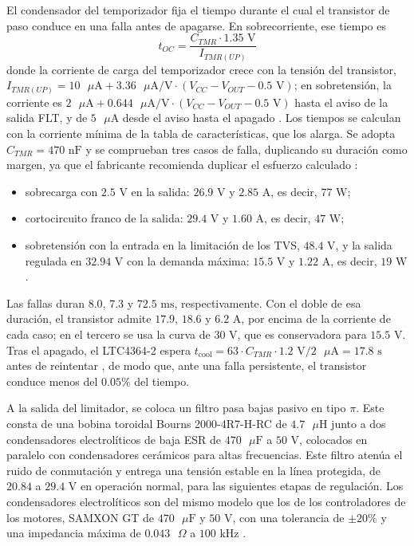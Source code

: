 \documentclass[../../General.tex]{subfiles}
\begin{document}
El condensador del temporizador fija el tiempo durante el cual el transistor de paso conduce en una falla antes de apagarse. En sobrecorriente, ese tiempo es \citep{adi_ltc4364}
\begin{equation}
t_{OC} = \frac{C_{TMR} \cdot 1.35\text{ V}}{I_{TMR(UP)}}
\end{equation}
donde la corriente de carga del temporizador crece con la tensión del transistor, $I_{TMR(UP)} = 10\text{ }\mu\text{A} + 3.36\text{ }\mu\text{A/V} \cdot (V_{CC} - V_{OUT} - 0.5\text{ V})$; en sobretensión, la corriente es $2\text{ }\mu\text{A} + 0.644\text{ }\mu\text{A/V} \cdot (V_{CC} - V_{OUT} - 0.5\text{ V})$ hasta el aviso de la salida FLT, y de $5\text{ }\mu\text{A}$ desde el aviso hasta el apagado \citep{adi_ltc4364}. Los tiempos se calculan con la corriente mínima de la tabla de características, que los alarga. Se adopta $C_{TMR} = 470\text{ nF}$ y se comprueban tres casos de falla, duplicando su duración como margen, ya que el fabricante recomienda duplicar el esfuerzo calculado \citep{adi_ltc4364}:
\begin{itemize}
    \item sobrecarga con $2.5\text{ V}$ en la salida: $26.9\text{ V}$ y $2.85\text{ A}$, es decir, $77\text{ W}$;
    \item cortocircuito franco de la salida: $29.4\text{ V}$ y $1.60\text{ A}$, es decir, $47\text{ W}$;
    \item sobretensión con la entrada en la limitación de los TVS, $48.4\text{ V}$, y la salida regulada en $32.94\text{ V}$ con la demanda máxima: $15.5\text{ V}$ y $1.22\text{ A}$, es decir, $19\text{ W}$.
\end{itemize}
Las fallas duran $8.0$, $7.3$ y $72.5\text{ ms}$, respectivamente. Con el doble de esa duración, el transistor admite $17.9$, $18.6$ y $6.2\text{ A}$, por encima de la corriente de cada caso; en el tercero se usa la curva de $30\text{ V}$, que es conservadora para $15.5\text{ V}$. Tras el apagado, el LTC4364-2 espera $t_{\text{cool}} = 63 \cdot C_{TMR} \cdot 1.2\text{ V}/2\text{ }\mu\text{A} = 17.8\text{ s}$ antes de reintentar \citep{adi_ltc4364}, de modo que, ante una falla persistente, el transistor conduce menos del $0.05\%$ del tiempo.

A la salida del limitador, se coloca un filtro pasa bajas pasivo en tipo $\pi$. Este consta de una bobina toroidal Bourns 2000-4R7-H-RC de $4.7\text{ }\mu\text{H}$ junto a dos condensadores electrolíticos de baja ESR de $470\text{ }\mu\text{F}$ a $50\text{ V}$, colocados en paralelo con condensadores cerámicos para altas frecuencias. Este filtro atenúa el ruido de conmutación y entrega una tensión estable en la línea protegida, de $20.84$ a $29.4\text{ V}$ en operación normal, para las siguientes etapas de regulación. Los condensadores electrolíticos son del mismo modelo que los de los controladores de los motores, SAMXON GT de $470\text{ }\mu\text{F}$ y $50\text{ V}$, con una tolerancia de $\pm 20\%$ y una impedancia máxima de $0.043\text{ }\Omega$ a $100\text{ kHz}$ \citep{samxon_gt}.
\end{document}
